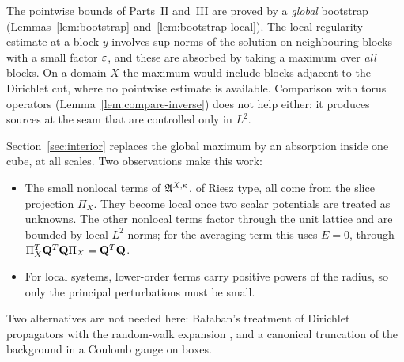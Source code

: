 \begin{remark}\label{rem:ID}
The pointwise bounds of Parts~II and~III are proved by a \emph{global} bootstrap (Lemmas~\ref{lem:bootstrap} and~\ref{lem:bootstrap-local}). The local regularity estimate at a block $y$ involves sup norms of the solution on neighbouring blocks with a small factor $\varepsilon$, and these are absorbed by taking a maximum over \emph{all} blocks. On a domain $X$ the maximum would include blocks adjacent to the Dirichlet cut, where no pointwise estimate is available. Comparison with torus operators (Lemma~\ref{lem:compare-inverse}) does not help either: it produces sources at the seam that are controlled only in $L^2$.

Section~\ref{sec:interior} replaces the global maximum by an absorption inside one cube, at all scales. Two observations make this work:
\begin{itemize}
\item The small nonlocal terms of $\mathfrak A^{X,\kappa}$, of Riesz type, all come from the slice projection $\Pi_X$. They become local once two scalar potentials are treated as unknowns. The other nonlocal terms factor through the unit lattice and are bounded by local $L^2$ norms; for the averaging term this uses $E=0$, through $\Pi_X^T\mathbf Q^T\mathbf Q\Pi_X=\mathbf Q^T\mathbf Q$.
\item For local systems, lower-order terms carry positive powers of the radius, so only the principal perturbations must be small.
\end{itemize}
Two alternatives are not needed here: Ba\l aban's treatment of Dirichlet propagators with the random-walk expansion \cite{BalPropI,BalBackground}, and a canonical truncation of the background in a Coulomb gauge on boxes.
\end{remark}
